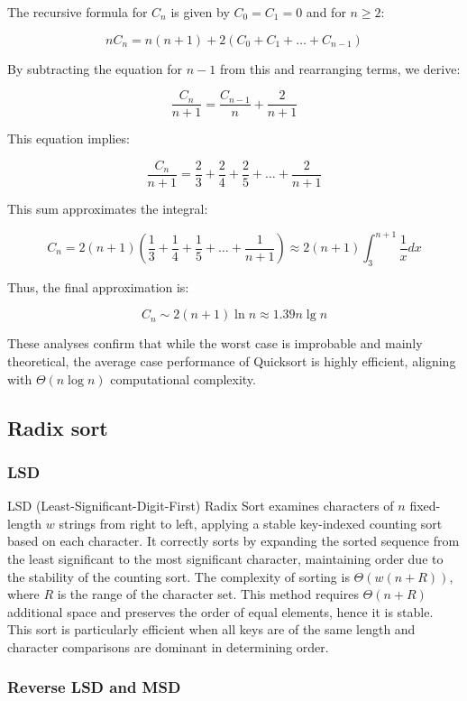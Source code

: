 \documentclass{article}
\begin{document}
The recursive formula for $C_n$ is given by $C_0 = C_1 = 0$ and for $n \geq 2$:

\[
n C_{n} = n(n+1) + 2\left(C_{0} + C_{1} + \ldots + C_{n-1}\right)
\]

By subtracting the equation for $n-1$ from this and rearranging terms, we derive:

\[
\frac{C_{n}}{n+1} = \frac{C_{n-1}}{n} + \frac{2}{n+1}
\]

This equation implies:

\[
\frac{C_{n}}{n+1} = \frac{2}{3} + \frac{2}{4} + \frac{2}{5} + \ldots + \frac{2}{n+1}
\]

This sum approximates the integral:

\[
C_{n} = 2(n+1)\left(\frac{1}{3} + \frac{1}{4} + \frac{1}{5} + \ldots + \frac{1}{n+1}\right) \approx 2(n+1) \int_{3}^{n+1} \frac{1}{x} dx
\]

Thus, the final approximation is:

\[
C_{n} \sim 2(n+1) \ln n \approx 1.39 n \lg n
\]

These analyses confirm that while the worst case is improbable and mainly theoretical, the average case performance of Quicksort is highly efficient, aligning with $\Theta(n \log n)$ computational complexity.

\subsection{Radix sort}

\subsubsection{LSD}

LSD (Least-Significant-Digit-First) Radix Sort examines characters of $n$ fixed-length $w$ strings from right to left, applying a stable key-indexed counting sort based on each character. It correctly sorts by expanding the sorted sequence from the least significant to the most significant character, maintaining order due to the stability of the counting sort. The complexity of sorting is $\Theta(w(n+R))$, where $R$ is the range of the character set. This method requires $\Theta(n+R)$ additional space and preserves the order of equal elements, hence it is stable. This sort is particularly efficient when all keys are of the same length and character comparisons are dominant in determining order.

\subsubsection{Reverse LSD and MSD}
\end{document}
